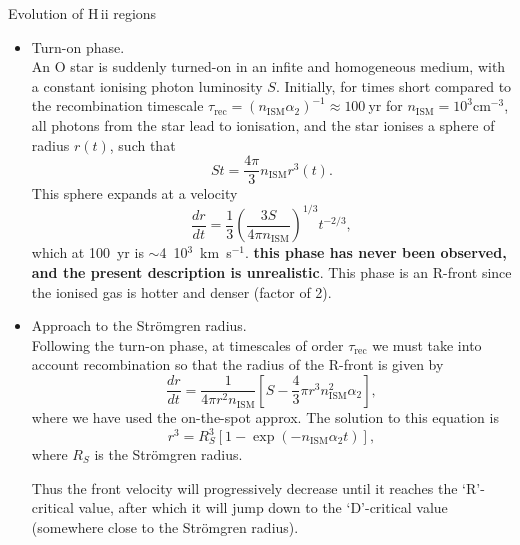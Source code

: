 \begin{frame}{Evolution of H\,{\sc ii} regions}

\begin{itemize}

\item Turn-on phase.  \\

 An O star is suddenly turned-on in an infite and homogeneous medium,
 with a constant ionising photon luminosity $S$. Initially, for times
 short compared to the recombination timescale $\tau_\mathrm{rec} =
 (n_\mathrm{ISM} \alpha_2)^{-1} \approx 100~$yr for $n_\mathrm{ISM} =
 10^3$cm$^{-3}$, all photons from the star lead to ionisation, and the
 star ionises a sphere of radius $r(t)$, such that
\[ 
S t = \frac{4 \pi}{3} n_\mathrm{ISM} r^3(t).
\]
This sphere expands at a velocity 
\[
\frac{dr}{dt} = \frac{1}{3} \left( \frac{3 S}{4 \pi n_\mathrm{ISM}}  \right)^{1/3}  t^{-2/3},
\]
which at 100~yr is $\sim$4~10$^{3}$~km~s$^{-1}$.  {\bf this phase has
  never been observed, and the present description is
  unrealistic}. This phase is an R-front since the ionised gas is
hotter and denser (factor of 2). 

\end{itemize}

\end{frame}




\begin{frame}{}

\begin{itemize}

\item Approach to the Str\"omgren radius.  \\ 

Following the turn-on phase, at timescales of order
$\tau_\mathrm{rec}$ we must take into account recombination so that
the radius of the R-front is given by
\[
\frac{dr}{dt}  = \frac{1}{4 \pi r^2 n_\mathrm{ISM} } \left[ S -
  \frac{4}{3} \pi r^3 n_\mathrm{ISM}^2 \alpha_2    \right],
\]
where we have used the on-the-spot approx.
The solution to this equation is 
\[ 
r^3 = R_S^3 [ 1 - \exp( - n_\mathrm{ISM} \alpha_2 t) ],
\]
where $R_S$ is the Str\"omgren radius. 

Thus the front velocity will progressively decrease until it reaches
the `R'-critical value, after which it will jump down to the
`D'-critical value (somewhere close to the Str\"omgren radius). 

\end{itemize}




\end{frame}




